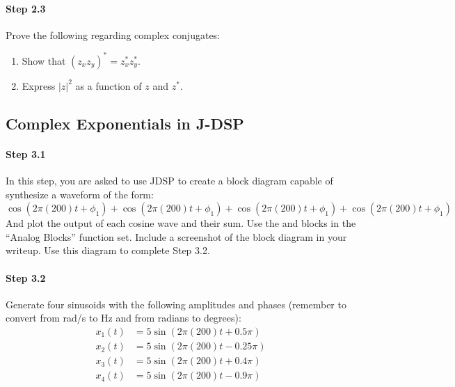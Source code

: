 \paragraph{Step 2.3} Prove the following regarding complex conjugates:

\begin{enumerate}
\item Show that $(z_xz_y)^* = z_x^* z_y^*$.

\item Express $|z|^2$ as a function of $z$ and $z^*$.

\end{enumerate}




\subsection{Complex Exponentials in J-DSP}

\paragraph{Step 3.1} In this step, you are asked to use JDSP
to create a block diagram capable of synthesize a waveform of the form:
$\cos(2\pi (200) t+\phi_1) + \cos(2\pi (200) t +\phi_1) +\cos(2\pi (200) t+\phi_1) +\cos(2\pi (200) t+\phi_1) $
And plot the output of each cosine wave and their sum. Use the  and  blocks in the ``Analog Blocks'' function set. Include a screenshot of the block diagram in your writeup. Use this diagram to complete Step 3.2.


\paragraph{Step 3.2} Generate four sinusoids with the following
amplitudes and phases (remember to convert from rad/s to Hz and from radians to degrees):
\begin{align}
x_1(t) &= 5 \sin(2\pi(200)t +0.5\pi) \\
x_2(t) &= 5 \sin(2\pi(200)t - 0.25\pi) \\
x_3(t) &= 5 \sin(2\pi(200)t +0.4\pi) \\
x_4(t) &= 5 \sin(2\pi(200)t - 0.9\pi) 
\end{align}

